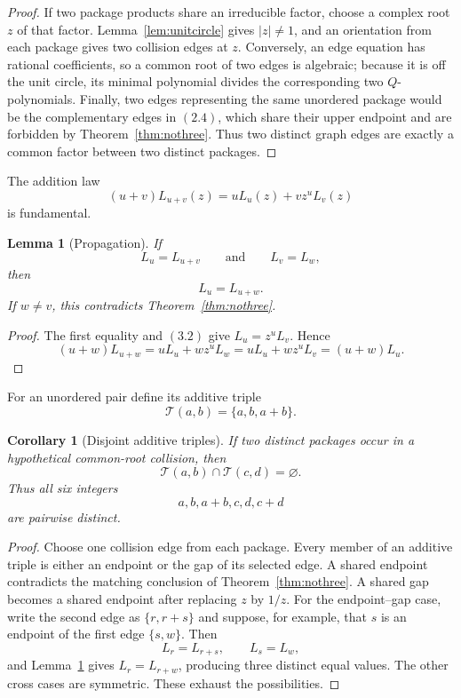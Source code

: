 \documentclass[11pt]{article}
\newtheorem{lemma}[theorem]{Lemma}
\newtheorem{corollary}[theorem]{Corollary}
\theoremstyle{definition}
\newcommand{\T}{\mathcal T}
\begin{document}
\begin{proof}
If two package products share an irreducible factor, choose a complex root
\(z\) of that factor.  Lemma~\ref{lem:unitcircle} gives \(|z|\neq1\), and
an orientation from each package gives two collision edges at \(z\).
Conversely, an edge equation has rational coefficients, so a common root of
two edges is algebraic; because it is off the unit circle, its minimal
polynomial divides the corresponding two \(Q\)-polynomials.  Finally, two
edges representing the same unordered package would be the complementary
edges in \((2.4)\), which share their upper endpoint and are forbidden by
Theorem~\ref{thm:nothree}.  Thus two distinct graph edges are exactly a common
factor between two distinct packages.
\end{proof}

The addition law
\begin{equation}
 (u+v)L_{u+v}(z)=uL_u(z)+vz^uL_v(z)
 \tag{3.2}
\end{equation}
is fundamental.

\begin{lemma}[Propagation]\label{lem:propagation}
If
\[
 L_u=L_{u+v}
 \qquad\text{and}\qquad
 L_v=L_w,
\]
then
\[
 L_u=L_{u+w}.
\]
If \(w\neq v\), this contradicts Theorem~\ref{thm:nothree}.
\end{lemma}

\begin{proof}
The first equality and \((3.2)\) give \(L_u=z^uL_v\).  Hence
\[
 (u+w)L_{u+w}=uL_u+wz^uL_w
 =uL_u+wz^uL_v=(u+w)L_u.
\]
\end{proof}

For an unordered pair define its additive triple
\[
 \T(a,b)=\{a,b,a+b\}.
\]

\begin{corollary}[Disjoint additive triples]\label{cor:triples}
If two distinct packages occur in a hypothetical common-root collision, then
\begin{equation}
 \T(a,b)\cap\T(c,d)=\varnothing.
 \tag{3.3}
\end{equation}
Thus all six integers
\[
 a,b,a+b,c,d,c+d
\]
are pairwise distinct.
\end{corollary}

\begin{proof}
Choose one collision edge from each package.  Every member of an additive
triple is either an endpoint or the gap of its selected edge.  A shared
endpoint contradicts the matching conclusion of Theorem~\ref{thm:nothree}.
A shared gap becomes a shared endpoint after replacing \(z\) by \(1/z\).
For the endpoint--gap case, write the second edge as
\(\{r,r+s\}\) and suppose, for example, that \(s\) is an endpoint of
the first edge \(\{s,w\}\).  Then
\[
 L_r=L_{r+s},\qquad L_s=L_w,
\]
and Lemma~\ref{lem:propagation} gives \(L_r=L_{r+w}\), producing three
distinct equal values.  The other cross cases are symmetric.  These exhaust
the possibilities.
\end{proof}
\end{document}
